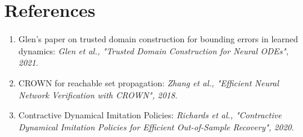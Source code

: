 \documentclass[12pt]{article}
\begin{document}
\section{References}

\begin{enumerate}
    \item Glen's paper on trusted domain construction for bounding errors in learned dynamics: \textit{Glen et al., "Trusted Domain Construction for Neural ODEs", 2021}.
    \item CROWN for reachable set propagation: \textit{Zhang et al., "Efficient Neural Network Verification with CROWN", 2018}.
    \item Contractive Dynamical Imitation Policies: \textit{Richards et al., "Contractive Dynamical Imitation Policies for Efficient Out-of-Sample Recovery", 2020}.
\end{enumerate}
\end{document}
